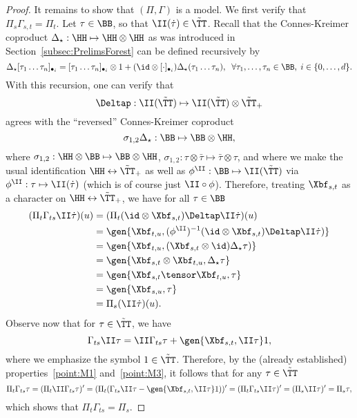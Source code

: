 \documentclass{article}
\begin{document}
\begin{proof}
It remains to show that $(\Pi,\Gamma)$ is a model. 
We first verify that $\Pi_s \Gamma_{s,t} = \Pi_t$. Let $\tau \in \BB$, so that $\II(\dot \tau) \in \tilde \TT$. Recall that the Connes-Kreimer coproduct $\Delta_\star : \HH \mapsto \HH \otimes \HH$ as was introduced in Section~\ref{subsec:PrelimsForest} can be defined recursively by
\[
\Delta_\star [\tau_1\ldots\tau_n]_{\bullet_i} = [\tau_1\ldots\tau_n]_{\bullet_i} \otimes 1 + (\id \otimes [\cdot]_{\bullet_i}) \Delta_\star(\tau_1\ldots \tau_n), \; \; \forall \tau_1,\ldots,\tau_n \in \BB, \; i \in \{0,\ldots, d\}.
\]
With this recursion, one can verify that
\[
\Deltap : \II(\tilde \TT) \mapsto \II(\tilde \TT) \otimes \tilde \TT_+
\]
agrees with the ``reversed'' Connes-Kreimer coproduct 
\[
\sigma_{1,2}\Delta_\star : \BB \mapsto \BB \otimes \HH,
\]
where $\sigma_{1,2} : \HH \otimes \BB \mapsto \BB \otimes \HH$, $\sigma_{1,2} : \tau \otimes \bar \tau \mapsto \bar \tau \otimes \tau$, and where we make the usual identification $\HH\leftrightarrow \tilde \TT_+$ as well as $\phi^{\II} : \BB \mapsto \II(\tilde \TT)$ via $\phi^{\II} : \tau \mapsto \II(\dot\tau)$ (which is of course just $\II\circ \phi$).
Therefore, treating $\Xbf_{s,t}$ as a character on $\HH \leftrightarrow \tilde \TT_+$, we have for all $\tau \in \BB$
\begin{align}\label{eq:Xtensor}
\begin{split}
(\Pi_t \Gamma_{ts}\II\dot \tau )(u) &= (\Pi_t(\id \otimes \Xbf_{s,t})\Deltap \II\dot\tau)(u) \\
&= \gen{\Xbf_{t,u}, (\phi^{\II})^{-1} (\id \otimes \Xbf_{s,t})\Deltap \II\dot\tau)} \\
&= \gen{\Xbf_{t,u}, (\Xbf_{s,t} \otimes \id)\Delta_\star \tau)} \\
&= \gen{\Xbf_{s,t} \otimes \Xbf_{t,u}, \Delta_\star \tau} \\
&= \gen{\Xbf_{s,t} \tensor \Xbf_{t,u}, \tau} \\
&= \gen{\Xbf_{s,u}, \tau} \\
&= \Pi_s(\II\dot \tau)(u).
\end{split}
\end{align}
Observe now that for $\tau \in \tilde \TT$, we have
\[
\Gamma_{ts}\II\tau = \II\Gamma_{ts}\tau + \gen{\Xbf_{s,t},\II\tau} 1,
\]
where we emphasize the symbol $1 \in \tilde \TT$. Therefore, by the (already established) properties~\ref{point:M1} and~\ref{point:M3}, it follows that for any $\tau \in \tilde \TT$
\[
\Pi_t \Gamma_{ts}\tau = (\Pi_t \II \Gamma_{ts} \tau )' = (\Pi_t(\Gamma_{ts} \II\tau - \gen{\Xbf_{s,t},\II\tau} 1))' = (\Pi_t\Gamma_{ts} \II\tau)' = (\Pi_s \II\tau)' = \Pi_s \tau,
\]
which shows that $\Pi_t\Gamma_{ts} = \Pi_s$.


\end{proof}
\end{document}

